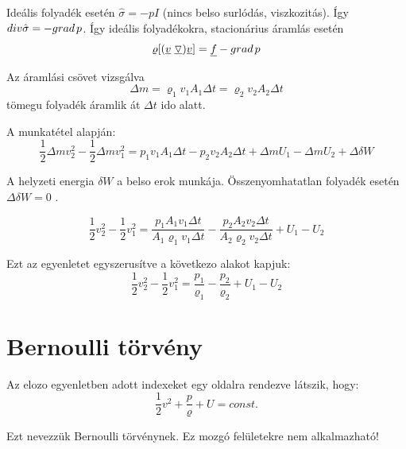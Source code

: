 \documentclass[a4paper,titlepage,12pt]{article}
\begin{document}
Ideális folyadék esetén $\hat{\sigma}=-p\hat{I}$ (nincs belso surlódás, viszkozitás). Így $div\hat{\sigma}=-grad\hspace{0.05 cm}p$. Így ideális folyadékokra, stacionárius áramlás esetén 
\begin{equation*}
\varrho[(\underline{v}\hspace{0.1 cm}\underline{\triangledown})\underline{v}]=\underline{f}-grad\hspace{0.05 cm}p 
\end{equation*}

Az áramlási csövet vizsgálva 
\begin{equation*}
\Delta m=\varrho_{1}v_{1}A_{1}\Delta t=\varrho_{2}v_{2}A_{2}\Delta t 
\end{equation*} tömegu folyadék áramlik át $\Delta t$ ido alatt.

A munkatétel alapján: 
\begin{equation*}
\frac{1}{2}\Delta mv_{2}^{2}-\frac{1}{2}\Delta mv_{1}^{2}=p_{1}v_{1}A_{1}\Delta t-p_{2}v_{2}A_{2}\Delta t+\Delta m U_{1}-\Delta m U_{2}+\Delta\delta W
\end{equation*}

A helyzeti energia $\delta W$ a belso erok munkája. Összenyomhatatlan folyadék esetén $\Delta\delta W=0$  .

\begin{equation*}
\frac{1}{2}v_{2}^{2}-\frac{1}{2}v_{1}^{2}=\frac{p_{1}A_{1}v_{1}\Delta t}{A_{1}\varrho_{1}v_{1}\Delta t}-\frac{p_{2}A_{2}v_{2}\Delta t}{A_{2}\varrho_{2}v_{2}\Delta t}+U_{1}-U_{2} 
\end{equation*}

Ezt az egyenletet egyszerusítve a következo alakot kapjuk: 
\begin{equation*}
\frac{1}{2}v_{2}^{2}-\frac{1}{2}v_{1}^{2}=\frac{p_{1}}{\varrho_{1}}-\frac{p_{2}}{\varrho_{2}}+U_{1}-U_{2} 
\end{equation*}

\part*{Bernoulli törvény}

Az elozo egyenletben adott indexeket egy oldalra rendezve látszik, hogy: 
\begin{equation*}
\frac{1}{2}v^{2}+\frac{p}{\varrho}+U=const.
\end{equation*}

Ezt nevezzük Bernoulli törvénynek. Ez mozgó felületekre nem alkalmazható!
\end{document}
